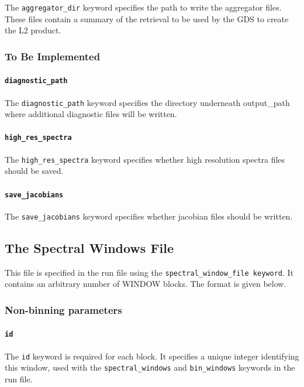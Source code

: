 \documentclass{article}
\begin{document}
The \texttt{aggregator\_dir} keyword specifies the path to write the
aggregator files.  These files contain a summary of the retrieval to
be used by the GDS to create the L2 product.

\subsubsection{To Be Implemented}

\paragraph{\texttt{diagnostic\_path}}

The \texttt{diagnostic\_path} keyword specifies the directory
underneath output\_path where additional diagnostic files will be written.

\paragraph{\texttt{high\_res\_spectra}}

The \texttt{high\_res\_spectra} keyword specifies whether high
resolution spectra files should be saved.

\paragraph{\texttt{save\_jacobians}}

The \texttt{save\_jacobians} keyword specifies whether jacobian files
should be written.

\subsection{The Spectral Windows File}

This file is specified in the run file using the
\texttt{spectral\_window\_file keyword}.  It contains an arbitrary number of
WINDOW blocks.  The format is given below.

\subsubsection{Non-binning parameters}

\paragraph{\texttt{id}}

The \texttt{id} keyword is required for each block.  It specifies a
unique integer identifying this window, used with the
\texttt{spectral\_windows} and \texttt{bin\_windows} keywords in the
run file.
\end{document}
